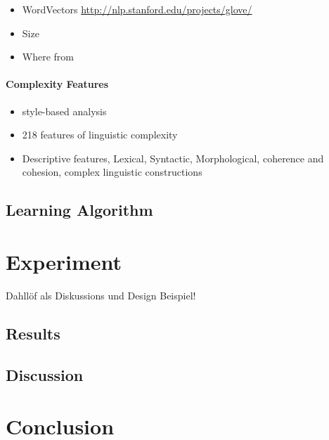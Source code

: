 \documentclass[11pt]{article}
\begin{document}
\begin{itemize}
\item WordVectors \url{http://nlp.stanford.edu/projects/glove/}
\item Size
\item Where from
\end{itemize}

\paragraph{Complexity Features}

\begin{itemize}
\item style-based analysis
\item 218 features of linguistic complexity
\item Descriptive features, Lexical, Syntactic, Morphological, coherence and cohesion, complex linguistic constructions
\end{itemize}

\subsection{Learning Algorithm}




\section{Experiment}\label{sec:exp}

Dahllöf als Diskussions und Design Beispiel!

\subsection{Results}

\subsection{Discussion}


\section{Conclusion}


\printbibliography[heading=bibintoc]
\end{document}
